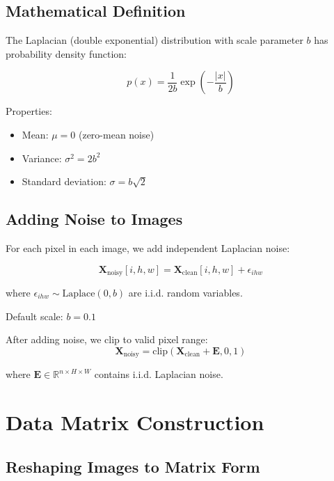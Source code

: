 \documentclass[12pt,a4paper]{article}
\begin{document}
\subsection{Mathematical Definition}

The Laplacian (double exponential) distribution with scale parameter $b$ has probability density function:

\begin{equation}
p(x) = \frac{1}{2b} \exp\left(-\frac{|x|}{b}\right)
\end{equation}

Properties:
\begin{itemize}
    \item Mean: $\mu = 0$ (zero-mean noise)
    \item Variance: $\sigma^2 = 2b^2$
    \item Standard deviation: $\sigma = b\sqrt{2}$
\end{itemize}

\subsection{Adding Noise to Images}

For each pixel in each image, we add independent Laplacian noise:

\begin{equation}
\mathbf{X}_{\text{noisy}}[i,h,w] = \mathbf{X}_{\text{clean}}[i,h,w] + \epsilon_{ihw}
\end{equation}

where $\epsilon_{ihw} \sim \text{Laplace}(0, b)$ are i.i.d. random variables.

Default scale: $b = 0.1$

After adding noise, we clip to valid pixel range:
\begin{equation}
\mathbf{X}_{\text{noisy}} = \text{clip}(\mathbf{X}_{\text{clean}} + \mathbf{E}, 0, 1)
\end{equation}

where $\mathbf{E} \in \mathbb{R}^{n \times H \times W}$ contains i.i.d. Laplacian noise.

\section{Data Matrix Construction}

\subsection{Reshaping Images to Matrix Form}
\end{document}
